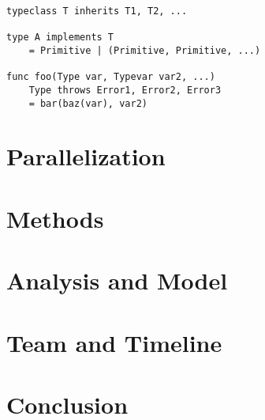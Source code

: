 \documentclass{acm_proc_article-sp}
\begin{document}

\begin{lstlisting}[caption=Grammar displayed informally,style=paratype]
typeclass T inherits T1, T2, ...

type A implements T
    = Primitive | (Primitive, Primitive, ...)

func foo(Type var, Typevar var2, ...)
    Type throws Error1, Error2, Error3
    = bar(baz(var), var2)
\end{lstlisting}

\section{Parallelization}


\section{Methods}


\section{Analysis and Model}


\section{Team and Timeline}

\section{Conclusion}


\end{document}
